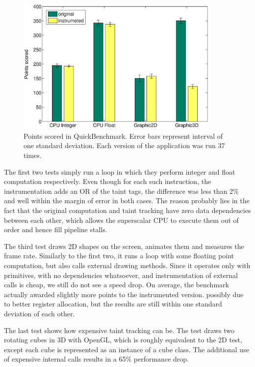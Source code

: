 \documentclass[12pt,twoside,notitlepage]{report}
\begin{document}
\begin{figure}[H]
	\centerline{
		\includegraphics[width=0.89\textwidth]{figs/fig_eval_quickbench.eps}
	}
	\caption{Points scored in QuickBenchmark. Error bars represent interval of one standard deviation. Each version of the application was run 37 times.}
	\label{figure:Evalutaion_QuickBench}
\end{figure}

The first two tests simply run a loop in which they perform integer and float computation respectively. Even though for each such instruction, the instrumentation adds an OR of the taint tags, the difference was less than 2\% and well within the margin of error in both cases. The reason probably lies in the fact that the original computation and taint tracking have zero data dependencies between each other, which allows the superscalar CPU to execute them out of order and hence fill pipeline stalls.

The third test draws 2D shapes on the screen, animates them and measures the frame rate. Similarly to the first two, it runs a loop with some floating point computation, but also calls external drawing methods. Since it operates only with primitives, with no dependencies whatsoever, and instrumentation of external calls is cheap, we still do not see a speed drop. On average, the benchmark actually awarded slightly more points to the instrumented version. possibly due to better register allocation, but the results are still within one standard deviation of each other. 

The last test shows how expensive taint tracking can be. The test draws two rotating cubes in 3D with OpenGL, which is roughly equivalent to the 2D test, except each cube is represented as an instance of a cube class. The additional use of expensive internal calls results in a 65\% performance drop.
\end{document}

